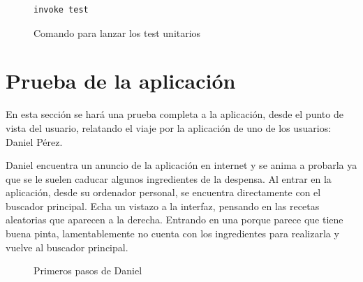 \begin{figure}
    \centering
    \begin{lstlisting}[style=consola]
        invoke test
    \end{lstlisting}
    \caption{Comando para lanzar los test unitarios}
    \label{sni:test}
\end{figure}

\section{Prueba de la aplicación}
En esta sección se hará una prueba completa a la aplicación, desde el punto de vista del usuario, relatando el viaje por la aplicación de uno de los usuarios: Daniel Pérez.

Daniel encuentra un anuncio de la aplicación en internet y se anima a probarla ya que se le suelen caducar algunos ingredientes de la despensa. Al entrar en la aplicación, desde su ordenador personal, se encuentra directamente con el buscador principal. Echa un vistazo a la \gls{interfaz}, pensando en las recetas aleatorias que aparecen a la derecha. Entrando en una porque parece que tiene buena pinta, lamentablemente no cuenta con los ingredientes para realizarla y vuelve al buscador principal. 

\newpage
\begin{figure}
    \centering
    \caption{Primeros pasos de Daniel}
    \label{fig:Daniel-pasos1}
\end{figure}

